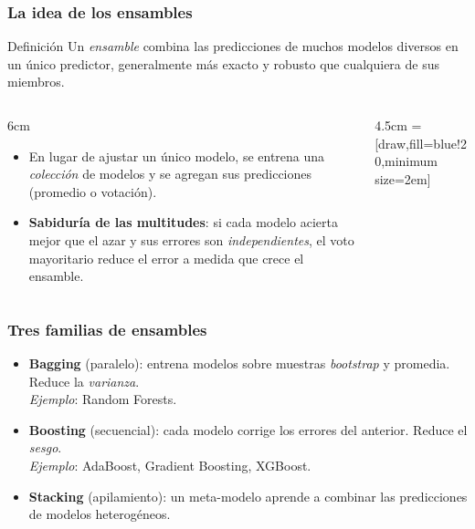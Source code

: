\documentclass[aspectratio=169, 10pt]{beamer}
\newcommand{\y}{\bm{y}}
\begin{document}
\begin{frame}
\frametitle{La idea de los ensambles}
\begin{block}{Definici\'on}
Un \emph{ensamble} combina las predicciones de muchos modelos diversos en un \'unico predictor, generalmente m\'as exacto y robusto que cualquiera de sus miembros.
\end{block}
\pause
\begin{columns}[T]
\begin{column}{6cm}
\begin{itemize}
	\item En lugar de ajustar un \'unico modelo, se entrena una \emph{colecci\'on} de modelos y se agregan sus predicciones (promedio o votaci\'on).
	\item \textbf{Sabidur\'ia de las multitudes}: si cada modelo acierta mejor que el azar y sus errores son \emph{independientes}, el voto mayoritario reduce el error a medida que crece el ensamble.
\end{itemize}
\end{column}
\begin{column}{4.5cm}
 = [draw,fill=blue!20,minimum size=2em]
\begin{center}
\end{center}
\end{column}
\end{columns}
\end{frame}

\begin{frame}
\frametitle{Tres familias de ensambles}
\begin{itemize}
	\item \textbf{Bagging} (paralelo): entrena modelos sobre muestras \emph{bootstrap} y promedia. Reduce la \emph{varianza}.\\ \emph{Ejemplo}: Random Forests.
	\item \textbf{Boosting} (secuencial): cada modelo corrige los errores del anterior. Reduce el \emph{sesgo}.\\ \emph{Ejemplo}: AdaBoost, Gradient Boosting, XGBoost.
	\item \textbf{Stacking} (apilamiento): un meta-modelo aprende a combinar las predicciones de modelos heterog\'eneos.
\end{itemize}
\end{frame}
\end{document}
